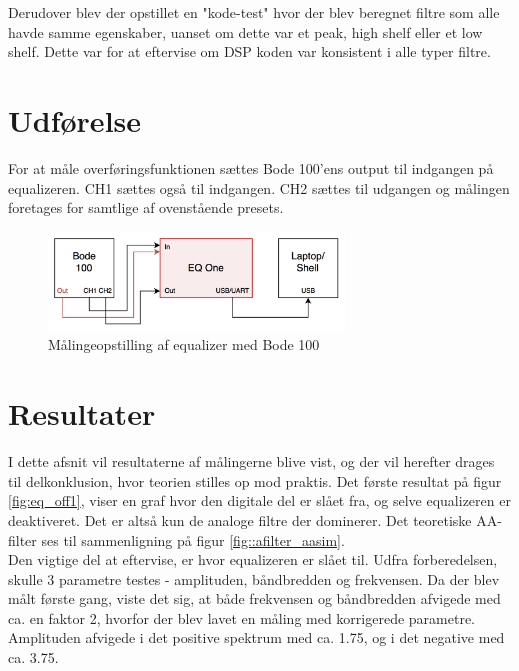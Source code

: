 Derudover blev der opstillet en "kode-test" hvor der blev beregnet filtre som alle havde samme egenskaber, uanset om dette var et peak, high shelf eller et low shelf. Dette var for at eftervise om DSP koden var konsistent i alle typer filtre. \\

\section{Udførelse}
For at måle overføringsfunktionen sættes Bode 100'ens output til indgangen på equalizeren. CH1 sættes også til indgangen. CH2 sættes til udgangen og målingen foretages for samtlige af ovenstående presets. \\


\begin{figure}[h!]\label{fig:bode_setup}
	\centering
	\includegraphics[width=0.7\textwidth]{billeder/bode_setup}
	\caption{Målingeopstilling af equalizer med Bode 100}
\end{figure}	

\FloatBlock

\section{Resultater}
I dette afsnit vil resultaterne af målingerne blive vist, og der vil herefter drages til delkonklusion, hvor teorien stilles op mod praktis.
Det første resultat på figur \ref{fig:eq_off1}, viser en graf hvor den digitale del er slået fra, og selve equalizeren er deaktiveret. Det er altså kun de analoge filtre der dominerer. Det teoretiske AA-filter ses til sammenligning på figur \ref{fig::afilter_aasim}. \\
Den vigtige del at eftervise, er hvor equalizeren er slået til. 
Udfra forberedelsen, skulle 3 parametre testes - amplituden, båndbredden og frekvensen. 
Da der blev målt første gang, viste det sig, at både frekvensen og båndbredden afvigede med ca. en faktor 2, hvorfor der blev lavet en måling med korrigerede parametre. Amplituden afvigede i det positive spektrum med ca. 1.75, og i det negative med ca. 3.75. \\

